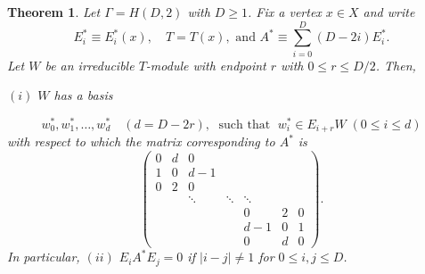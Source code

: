 \documentclass[
]{book}
\newtheorem{theorem}{Theorem}[chapter]
\theoremstyle{definition}
\theoremstyle{definition}
\theoremstyle{definition}
\theoremstyle{definition}
\theoremstyle{remark}
\begin{document}
\begin{theorem}
\protect\hypertarget{thm:hd2-modules2}{}\label{thm:hd2-modules2}Let \(\Gamma = H(D,2)\) with \(D\geq 1\). Fix a vertex \(x\in X\) and write
\[E^*_i \equiv E^*_i(x), \quad T = T(x), \text{ and } A^* \equiv \sum_{i=0}^D(D-2i)E^*_i.\]
Let \(W\) be an irreducible \(T\)-module with endpoint \(r\) with \(0\leq r\leq D/2\). Then,

\((i)\) \(W\) has a basis

\[w_0^*, w_1^*, \ldots, w_d^* \quad(d = D-2r), \; \text{ such that }\; w_i^*\in E_{i+r}W\; (0\leq i \leq d)\]
with respect to which the matrix corresponding to \(A^*\) is
\[\begin{pmatrix} 
0 & d & 0   &  & & &  \\
1 & 0 & d-1 &  & & & \\
0 & 2 & 0   &  & & & \\
  &   & \ddots    & \ddots & \ddots &  & \\
  &   &                   & & 0 & 2 & 0 \\
  &   &      & & d-1 & 0 & 1\\
  &   &      & & 0 & d & 0
\end{pmatrix}.\]
In particular,
\textbar{} \((ii)\) \(E_iA^*E_j = 0\) if \(|i-j|\neq 1\) for \(0 \leq i, j\leq D\).
\end{theorem}
\end{document}
